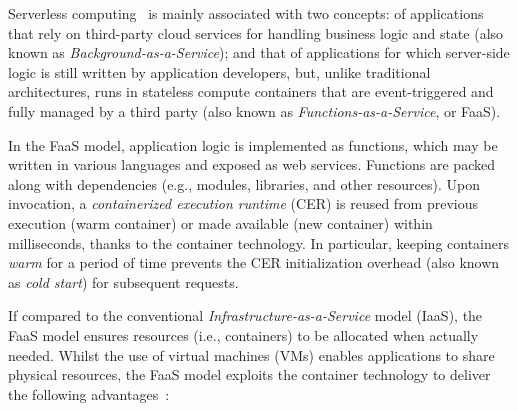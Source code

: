 
Serverless computing~\cite{Lloyd18serverless,Roberts:2018} is mainly associated with two concepts: of applications that rely on third-party cloud services for handling business logic and state (also known as \textit{Background-as-a-Service}); and that of applications for which server-side logic is still written by application developers, but, unlike traditional architectures, runs in stateless compute containers that are event-triggered
and fully managed by a third party (also known as \textit{Functions-as-a-Service}, or FaaS).

In the FaaS model, application logic is implemented as functions, which may be written in various languages and exposed as web services. Functions are packed along with dependencies (e.g., modules, libraries, and other resources). Upon invocation, a \textit{containerized execution runtime} (CER) is reused from previous execution (warm container) or made available (new container) within milliseconds, thanks to the container technology. In particular, keeping containers \textit{warm} for a period of time prevents the CER initialization overhead (also known as \textit{cold start}) for subsequent requests. 





If compared to the conventional \textit{Infrastructure-as-a-Service} model (IaaS), %
the FaaS model ensures resources (i.e., containers) to be allocated when actually needed. Whilst the use of virtual machines (VMs) enables applications to share physical resources, the FaaS model exploits the container technology to deliver the following advantages~\cite{GarrigaMendonca2017}:

